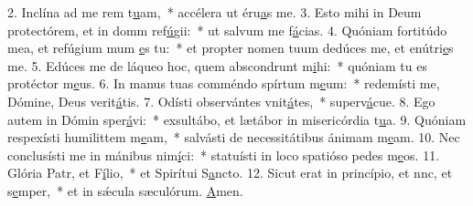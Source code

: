 2. Inclína ad me rem t\uline{u}am,~* accélera ut éru\uline{a}s me.
3. Esto mihi in Deum protectórem, et in domm ref\uline{ú}gii:~* ut salvum me f\uline{á}cias.
4. Quóniam fortitúdo mea, et refúgium mum \uline{e}s tu:~* et propter nomen tuum dedúces me, et enútri\uline{e}s me.
5. Edúces me de láqueo hoc, quem abscondrunt m\uline{i}hi:~* quóniam tu es protéctor m\uline{e}us.
6. In manus tuas comméndo spírtum m\uline{e}um:~* redemísti me, Dómine, Deus verit\uline{á}tis.
7. Odísti observántes vnit\uline{á}tes,~* superv\uline{á}cue.
8. Ego autem in Dómin sper\uline{á}vi:~* exsultábo, et lætábor in misericórdia t\uline{u}a.
9. Quóniam respexísti humilittem m\uline{e}am,~* salvásti de necessitátibus ánimam m\uline{e}am.
10. Nec conclusísti me in mánibus nim\uline{í}ci:~* statuísti in loco spatióso pedes m\uline{e}os.
11. Glória Patr, et F\uline{í}lio,~* et Spirítui S\uline{a}ncto.
12. Sicut erat in princípio, et nnc, et s\uline{e}mper,~* et in sǽcula sæculórum. \uline{A}men.
